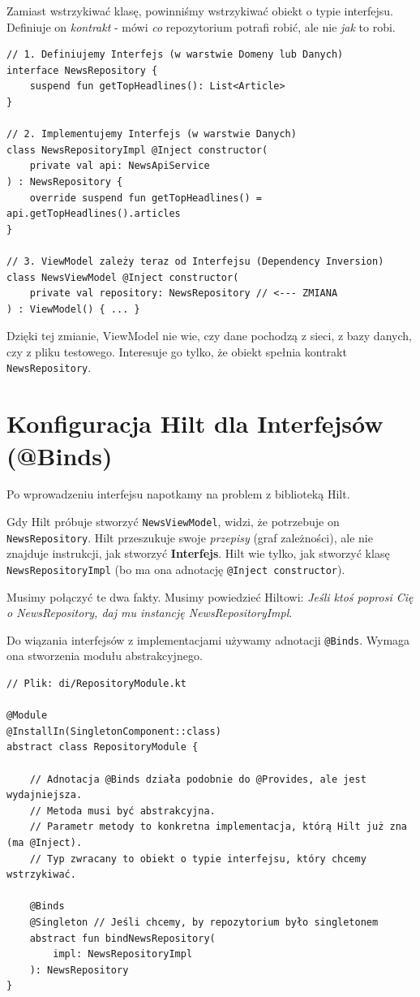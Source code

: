 Zamiast wstrzykiwać klasę, powinniśmy wstrzykiwać obiekt o typie interfejsu. Definiuje on \textit{kontrakt} - mówi \textit{co} repozytorium potrafi robić, ale nie \textit{jak} to robi.

\begin{verbatim}
// 1. Definiujemy Interfejs (w warstwie Domeny lub Danych)
interface NewsRepository {
    suspend fun getTopHeadlines(): List<Article>
}

// 2. Implementujemy Interfejs (w warstwie Danych)
class NewsRepositoryImpl @Inject constructor(
    private val api: NewsApiService
) : NewsRepository {
    override suspend fun getTopHeadlines() = api.getTopHeadlines().articles
}

// 3. ViewModel zależy teraz od Interfejsu (Dependency Inversion)
class NewsViewModel @Inject constructor(
    private val repository: NewsRepository // <--- ZMIANA
) : ViewModel() { ... }
\end{verbatim}

Dzięki tej zmianie, ViewModel nie wie, czy dane pochodzą z sieci, z bazy danych, czy z pliku testowego. Interesuje go tylko, że obiekt spełnia kontrakt \texttt{NewsRepository}.

\section{Konfiguracja Hilt dla Interfejsów (@Binds)}

Po wprowadzeniu interfejsu napotkamy na problem z biblioteką Hilt.

Gdy Hilt próbuje stworzyć \texttt{NewsViewModel}, widzi, że potrzebuje on \texttt{NewsRepository}. Hilt przeszukuje swoje \textit{przepisy} (graf zależności), ale nie znajduje instrukcji, jak stworzyć \textbf{Interfejs}. Hilt wie tylko, jak stworzyć klasę \texttt{NewsRepositoryImpl} (bo ma ona adnotację \texttt{@Inject constructor}).

Musimy połączyć te dwa fakty. Musimy powiedzieć Hiltowi: \textit{Jeśli ktoś poprosi Cię o NewsRepository, daj mu instancję NewsRepositoryImpl}.

Do wiązania interfejsów z implementacjami używamy adnotacji \texttt{@Binds}. Wymaga ona stworzenia modułu abstrakcyjnego.

\begin{verbatim}
// Plik: di/RepositoryModule.kt

@Module
@InstallIn(SingletonComponent::class)
abstract class RepositoryModule {

    // Adnotacja @Binds działa podobnie do @Provides, ale jest wydajniejsza.
    // Metoda musi być abstrakcyjna.
    // Parametr metody to konkretna implementacja, którą Hilt już zna (ma @Inject).
    // Typ zwracany to obiekt o typie interfejsu, który chcemy wstrzykiwać.
    
    @Binds
    @Singleton // Jeśli chcemy, by repozytorium było singletonem
    abstract fun bindNewsRepository(
        impl: NewsRepositoryImpl
    ): NewsRepository
}
\end{verbatim}

